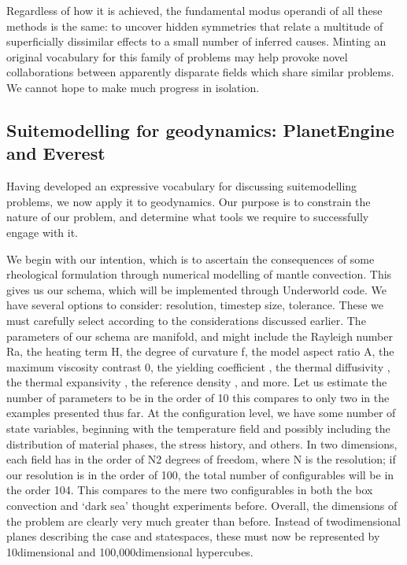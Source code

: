 \documentclass[letterpaper,10pt,english]{jupyterBook}
\begin{document}
\sphinxAtStartPar
Regardless of how it is achieved, the fundamental modus operandi of all these methods is the same: to uncover hidden symmetries that relate a multitude of superficially dissimilar effects to a small number of inferred causes. Minting an original vocabulary for this family of problems may help provoke novel collaborations between apparently disparate fields which share similar problems. We cannot hope to make much progress in isolation.


\subsection{Suite\sphinxhyphen{}modelling for geodynamics: PlanetEngine and Everest}
\label{\detokenize{content/chapter_02_methods/section3:suite-modelling-for-geodynamics-planetengine-and-everest}}
\sphinxAtStartPar
Having developed an expressive vocabulary for discussing suite\sphinxhyphen{}modelling problems, we now apply it to geodynamics. Our purpose is to constrain the nature of our problem, and determine what tools we require to successfully engage with it.

\sphinxAtStartPar
We begin with our intention, which is to ascertain the consequences of some rheological formulation through numerical modelling of mantle convection. This gives us our schema, which will be implemented through Underworld code. We have several options to consider: resolution, timestep size, tolerance. These we must carefully select according to the considerations discussed earlier. The parameters of our schema are manifold, and might include the Rayleigh number Ra, the heating term H, the degree of curvature f, the model aspect ratio A, the maximum viscosity contrast 0, the yielding coefficient , the thermal diffusivity , the thermal expansivity , the reference density , and more. Let us estimate the number of parameters to be in the order of 10 \sphinxhyphen{} this compares to only two in the examples presented thus far. At the configuration level, we have some number of state variables, beginning with the temperature field and possibly including the distribution of material phases, the stress history, and others. In two dimensions, each field has in the order of N2 degrees of freedom, where N is the resolution; if our resolution is in the order of 100, the total number of configurables will be in the order 104. This compares to the mere two configurables in both the box convection and ‘dark sea’ thought experiments before. Overall, the dimensions of the problem are clearly very much greater than before. Instead of two\sphinxhyphen{}dimensional planes describing the case\sphinxhyphen{} and state\sphinxhyphen{}spaces, these must now be represented by 10\sphinxhyphen{}dimensional and 100,000\sphinxhyphen{}dimensional hypercubes.
\end{document}
